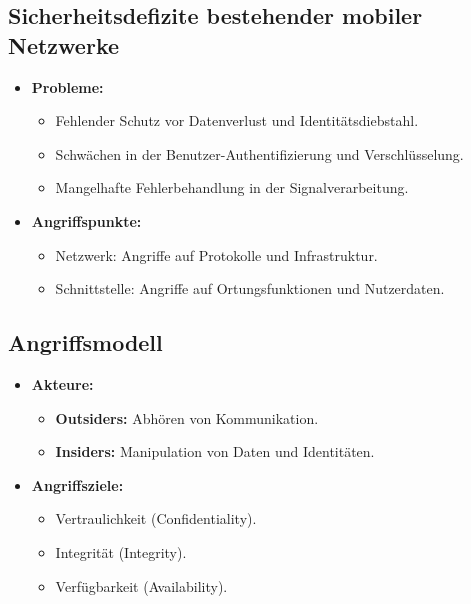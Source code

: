 \documentclass{article}
\begin{document}
\subsection{Sicherheitsdefizite bestehender mobiler Netzwerke}
\begin{itemize}
    \item \textbf{Probleme:}
    \begin{itemize}
        \item Fehlender Schutz vor Datenverlust und Identitätsdiebstahl.
        \item Schwächen in der Benutzer-Authentifizierung und Verschlüsselung.
        \item Mangelhafte Fehlerbehandlung in der Signalverarbeitung.
    \end{itemize}
    \item \textbf{Angriffspunkte:}
    \begin{itemize}
        \item Netzwerk: Angriffe auf Protokolle und Infrastruktur.
        \item Schnittstelle: Angriffe auf Ortungsfunktionen und Nutzerdaten.
    \end{itemize}
\end{itemize}

\subsection{Angriffsmodell}
\begin{itemize}
    \item \textbf{Akteure:}
    \begin{itemize}
        \item \textbf{Outsiders:} Abhören von Kommunikation.
        \item \textbf{Insiders:} Manipulation von Daten und Identitäten.
    \end{itemize}
    \item \textbf{Angriffsziele:}
    \begin{itemize}
        \item Vertraulichkeit (Confidentiality).
        \item Integrität (Integrity).
        \item Verfügbarkeit (Availability).
    \end{itemize}
\end{itemize}
\end{document}

